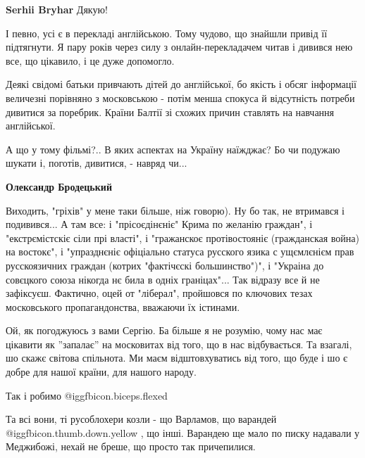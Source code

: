 \begin{itemize}
\begin{itemize}
\textbf{Serhii Bryhar} Дякую!

І певно, усі є в перекладі англійською. Тому чудово, що знайшли привід її
підтягнути. Я пару років через силу з онлайн-перекладачем читав і дивився нею
все, що цікавило, і це дуже допомогло.

Деякі свідомі батьки привчають дітей до англійської, бо якість і обсяг
інформації величезні порівняно з московською - потім менша спокуса й
відсутність потреби дивитися за поребрик. Країни Балтії зі схожих причин
ставлять на навчання англійської.

\end{itemize} %


А що у тому фільмі?.. В яких аспектах на Україну наїжджає? Бо чи подужаю шукати
і, поготів, дивитися, - навряд чи...

\begin{itemize} %
\textbf{Олександр Бродецький} 

Виходить, "гріхів" у мене таки більше, ніж говорю). Ну бо так, не втримався і
подивився... А там все: і "прісоєдінєніє" Крима по желанію граждан", і
"екстрємістскіє сіли прі власті", і "гражанскоє протівостояніє (гражданская
война) на востокє", і "упразднєніє офіціально статуса русского язика с
ущємлєнієм прав русскоязичних граждан (котрих "фактічєскі большинство")", і
"Украіна до совєцкого союза нікогда нє била в одніх граніцах"... Так відразу
все й не зафіксуєш. Фактично, оцей от "ліберал", пройшовся по ключових тезах
московського пропагандонства, вважаючи їх істинами.

\end{itemize} %


Ой, як погоджуюсь з вами Сергію. Ба більше я не розумію, чому нас має цікавити
як ''запалає'' на московитах від того, що в нас відбувається. Та взагалі, шо
скажє світова спільнота. Ми маєм відштовхуватись від того, що буде і шо є добре
для нашої країни, для нашого народу.

Так і робимо @igg{fbicon.biceps.flexed} 


Та всі вони, ті русоблохери козли - що Варламов, що варандей  @igg{fbicon.thumb.down.yellow}  , що інші.
Варандею ще мало по писку надавали у Меджибожі, нехай не бреше, що просто так
причепилися.


\end{itemize}
